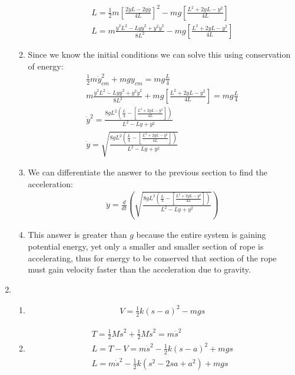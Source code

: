 \documentclass[12pt]{article}
\newcommand{\der}[2]{\frac{d #1}{d #2}}
\begin{document}
\begin{enumerate}
\begin{enumerate}
\begin{gather}
        L=\frac{1}{2}m\left[\frac{2\dot{y}L-2y\dot{y}}{4L}\right]^2-mg\left[ \frac{L^2+2yL-y^2}{4L}\right]\\
        L=m\frac{\dot{y}^2 L^2-Ly\dot{y}^2+y^2\dot{y}^2}{8L^2}-mg\left[ \frac{L^2+2yL-y^2}{4L}\right]
      \end{gather}
      \item
      Since we know the initial conditions we can solve this using conservation of energy:
      \begin{gather}
        \frac{1}{2}m\dot{y}_{cm}^2+mgy_{cm}=mg\frac{L}{4}\\
        m\frac{\dot{y}^2 L^2-Ly\dot{y}^2+y^2\dot{y}^2}{8L^2}+mg\left[ \frac{L^2+2yL-y^2}{4L}\right]=mg\frac{L}{4}\\
        \dot{y}^2=\frac{8gL^2\left(\frac{L}{4}-\left[ \frac{L^2+2yL-y^2}{4L}\right]\right)}{ L^2-Ly+y^2}\\
        \dot{y}=\sqrt{\frac{8gL^2\left(\frac{L}{4}-\left[ \frac{L^2+2yL-y^2}{4L}\right]\right)}{ L^2-Ly+y^2}}
      \end{gather}
      \item
      We can differentiate the answer to the previous section to find the acceleration:
      \begin{gather}
        \ddot{y}=\der{}{t}\left(\sqrt{\frac{8gL^2\left(\frac{L}{4}-\left[ \frac{L^2+2yL-y^2}{4L}\right]\right)}{ L^2-Ly+y^2}}\right)
      \end{gather}
      \item This answer is greater than $g$ because the entire system is gaining potential energy, yet only a smaller and smaller section of rope is accelerating, thus for energy to be conserved that section of the rope must gain velocity faster than the acceleration due to gravity.
    \end{enumerate}
    \item
    \begin{enumerate}
      \item
      \begin{gather}
        V=\frac{1}{2}k(s-a)^2-mgs
      \end{gather}
      \item
      \begin{gather}
        T=\frac{1}{2}M\dot{s}^2+\frac{1}{2}M\dot{s}^2=m\dot{s}^2\\
        L=T-V=m\dot{s}^2-\frac{1}{2}k(s-a)^2+mgs\\
        L=m\dot{s}^2-\frac{1}{2}k(s^2-2sa+a^2)+mgs
      \end{gather}

\end{enumerate}
\end{enumerate}
\end{document}
